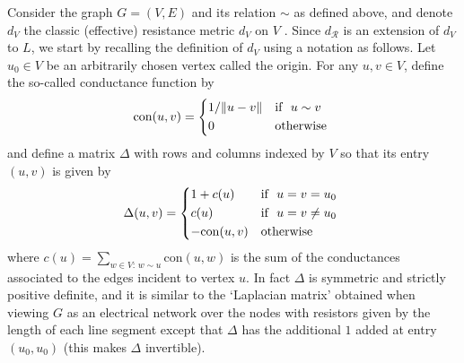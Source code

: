 \documentclass[alpha-refs]{wiley-article}
\begin{document}
 Consider the graph $G=(V,E)$ and its relation $\sim$ as defined above, and denote $d_V$  the classic (effective) resistance metric $d_V$ on $V$ \citep{KleinRandic}. %
 Since $d_\mathcal{R}$ is an extension of $d_V$ to $L$, we start by recalling the definition of $d_V$ using a notation as follows.
Let $u_0\in V$ be an arbitrarily chosen vertex called the origin.
For any $u,v\in V$, define the so-called conductance function by
\[{\mathrm{con}}(u,v)=\begin{cases*}
                    1/\|u-v\| & \text{if } $u\sim v$  \\
                     0 & \text{otherwise}
                 \end{cases*}
                 \] 
and define a matrix $\Delta$ with rows and columns indexed by $V$ so that its entry $(u,v)$ is given by
\[\Delta(u,v)=\begin{cases*}
                    1+c(u) & \text{if } $u=v=u_0$  \\
                     c(u) & \text{if } $u=v\not=u_0$\\
                     -{\mathrm{con}}(u,v) & \text{otherwise}
                 \end{cases*}
                 \] 
where $c(u)=\sum_{w\in V:\,w\sim u}{\mathrm{con}}(u,w)$ is the sum of the conductances associated to the edges incident to vertex $u$.
In fact $\Delta$ is symmetric and strictly positive definite, and it is similar to %
the `Laplacian matrix' obtained 
when viewing $G$ as an electrical network over the nodes with resistors given by the length of each line segment \citep[see e.g.][]{Kigami,JorgensenPearse} 
except that $\Delta$ has the additional $1$ added at entry $(u_0,u_0)$ (this makes $\Delta$ invertible). 
\end{document}
